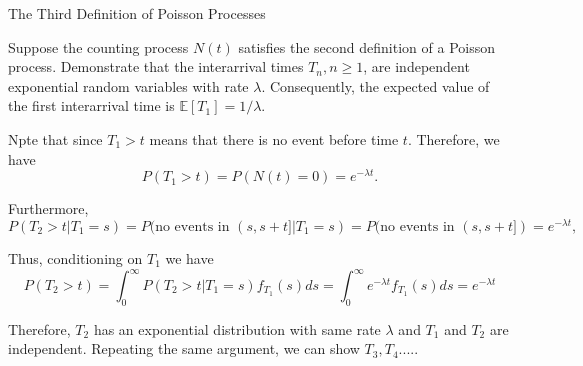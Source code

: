 \documentclass{beamer}
\begin{document}
\begin{frame}{The Third Definition of Poisson Processes}


    {\footnotesize \footnotesize
    \par Suppose the counting process \( N(t) \) satisfies the second definition of a Poisson process. 
    Demonstrate that the interarrival times \( T_n,  n \geq 1 \), are independent exponential 
    random variables with rate \(\lambda\). 
    Consequently, the expected value of the first interarrival time is \( \mathbb{E}[T_1] = 1/\lambda \).
    \vspace{1em}
    \par [Proof]
    \par Npte that since \( T_1 > t \) means that there is no event before time \( t \). Therefore, we have  
        \[
        P(T_1 > t) = P(N(t) = 0) = e^{-\lambda t}.
        \]  
    \par Furthermore,  
    \[
    P(T_2 > t|T_1 = s) = P(\text{no events in } (s, s + t]|T_1 = s) = P(\text{no events in } (s, s + t]) = e^{-\lambda t},
    \]  
    \par Thus, conditioning on \( T_1 \) we have  
    \[
    P(T_2 > t) = \int_{0}^{\infty} P(T_2 > t|T_1 = s)f_{T_1}(s)ds = \int_{0}^{\infty} e^{-\lambda t}f_{T_1}(s)ds
     =  e^{-\lambda t}
    \]  
     \par Therefore, \( T_2 \) has an exponential distribution with same rate $\lambda$ and  \( T_1 \) and \( T_2 \) are independent.  
    Repeating the same argument, we can show $T_3, T_4.....$
    }
    
\end{frame}
\end{document}
